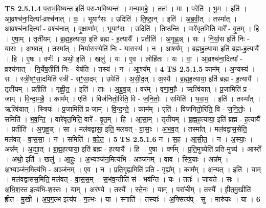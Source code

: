 \documentclass[17pt]{extarticle}
\begin{document}
                  \newline
                                \textbf{ TS 2.5.1.4} \newline
                  प॒रा॒भ॒वि॒ष्यन्त॒ इति॑ परा-भ॒वि॒ष्यन्तः॑ । म॒न्या॒म॒हे॒ । ततः॑ । मा । परेति॑ । भू॒म॒ । इति॑ । आ॒व्रश्च॑ना॒दित्या᳚-व्रश्च॑नात् । वः॒ । भूयाꣳ॑सः । उदिति॑ । ति॒ष्ठा॒न् । इति॑ । अ॒ब्र॒वी॒त् । तस्मा᳚त् । आ॒व्रश्च॑ना॒दित्या᳚ - व्रश्च॑नात् । वृ॒क्षाणा᳚म् । भूयाꣳ॑सः । उदिति॑ । ति॒ष्ठ॒न्ति॒ । वारे॑वृत॒मिति॒ वारे᳚ - वृ॒त॒म् । हि । ए॒षा॒म् । तृती॑यम् । ब्र॒ह्म॒ह॒त्याया॒ इति॑ ब्रह्म - ह॒त्यायै᳚ । प्रतीति॑ । अ॒गृ॒ह्ण॒न्न् । सः । नि॒र्या॒स इति॑ निः - या॒सः । अ॒भ॒व॒त् । तस्मा᳚त् । नि॒र्या॒सस्येति॑ निः - या॒सस्य॑ । न । आ॒श्य᳚म् । ब्र॒ह्म॒ह॒त्याया॒ इति॑ ब्रह्म-ह॒त्यायै᳚ । हि । ए॒षः । वर्णः॑ । अथो॒ इति॑ । खलु॑ । यः । ए॒व । लोहि॑तः । यः । वा॒ । आ॒व्रश्च॑ना॒दित्या᳚ - व्रश्च॑नात् । नि॒र्येष॒तीति॑ निः - येष॑ति । तस्य॑ । न । आ॒श्य᳚म् । \textbf{  4} \newline
                  \newline
                                \textbf{ TS 2.5.1.5} \newline
                  काम᳚म् । अ॒न्यस्य॑ । सः । स्त्री॒षꣳ॒॒सा॒दमिति॑ स्त्री - सꣳ॒॒सा॒दम् । उपेति॑ । अ॒सी॒द॒त् । अ॒स्यै । ब्र॒ह्म॒ह॒त्याया॒ इति॑ ब्रह्म - ह॒त्यायै᳚ । तृती॑यम् । प्रतीति॑ । गृ॒ह्णी॒त॒ । इति॑ । ताः । अ॒ब्रु॒व॒न्न् । वर᳚म् । वृ॒णा॒म॒है॒ । ऋत्वि॑यात् । प्र॒जामिति॑ प्र - जाम् । वि॒न्दा॒म॒है॒ । काम᳚म् । एति॑ । विज॑नितो॒रिति॒ वि - ज॒नि॒तोः॒ । समिति॑ । भ॒वा॒म॒ । इति॑ । तस्मा᳚त् । ऋत्वि॑यात् । स्त्रियः॑ । प्र॒जामिति॑ प्र-जाम् । वि॒न्द॒न्ते॒ । काम᳚म् । एति॑ । विज॑नितो॒रिति॒ वि - ज॒नि॒तोः॒ । समिति॑ । भ॒व॒न्ति॒ । वारे॑वृत॒मिति॒ वारे᳚ - वृ॒त॒म् । हि । आ॒सा॒म् । तृती॑यम् । ब्र॒ह्म॒ह॒त्याया॒ इति॑ ब्रह्म - ह॒त्यायै᳚ । प्रतीति॑ । अ॒गृ॒ह्ण॒न्न् । सा । मल॑वद्वासा॒ इति॒ मल॑वत् - वा॒साः॒ । अ॒भ॒व॒त् । तस्मा᳚त् । मल॑वद्वास॒सेति॒ मल॑वत् - वा॒स॒सा॒ । न । समिति॑ । व॒दे॒त॒ । \textbf{  5} \newline
                  \newline
                                \textbf{ TS 2.5.1.6} \newline
                  न । स॒ह । आ॒सी॒त॒ । न । अ॒स्याः॒ । अन्न᳚म् । अ॒द्या॒त् । ब्र॒ह्म॒ह॒त्याया॒ इति॑ ब्रह्म - ह॒त्यायै᳚ । हि । ए॒षा । वर्ण᳚म् । प्र॒ति॒मुच्येति॑ प्रति-मुच्य॑ । आस्ते᳚ । अथो॒ इति॑ । खलु॑ । आ॒हुः॒ । अ॒भ्यञ्ज॑न॒मित्य॑भि - अञ्ज॑नम् । वाव । स्त्रि॒याः । अन्न᳚म् । अ॒भ्यञ्ज॑न॒मित्य॑भि - अञ्ज॑नम् । ए॒व । न । प्र॒ति॒गृह्य॒मिति॑ प्रति - गृह्य᳚म् । काम᳚म् । अ॒न्यत् । इति॑ । याम् । मल॑वद्वासस॒मिति॒ मल॑वत् - वा॒स॒स॒म् । स॒भंव॒न्तीति॑ सं - भव॑न्ति । यः । ततः॑ । जाय॑ते । सः । अ॒भि॒श॒स्त इत्य॑भि-श॒स्तः । याम् । अर॑ण्ये । तस्यै᳚ । स्ते॒नः । याम् । परा॑चीम् । तस्यै᳚ । ह्री॒त॒मु॒खीति॑ ह्रीत - मु॒खी । अ॒प॒ग॒ल्भ इत्य॑प - ग॒ल्भः । या । स्नाति॑ । तस्याः᳚ । अ॒फ्सित्य॑प् - सु । मारु॑कः । या । \textbf{  6} \newline
\end{document}
